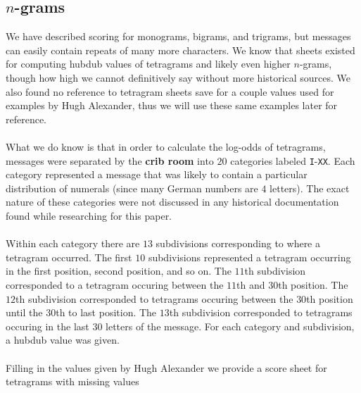 \subsection{$n$-grams}
We have described scoring for monograms, bigrams, and trigrams, but
messages can easily contain repeats of many more characters. We
know that sheets existed for computing hubdub values of tetragrams
and likely even higher $n$-grams, though how high we cannot
definitively say without more historical sources. We also found no
reference to tetragram sheets save for a couple values used for
examples by Hugh Alexander, thus we will use these same examples
later for reference.
\\\\What we do know is that in order to calculate the log-odds of
tetragrams, messages were separated by the {\bf{crib room}} into
$20$ categories labeled \texttt{I}-\texttt{XX}. Each category
represented a message that was likely to contain a particular
distribution of numerals (since many German numbers are $4$
letters). The exact nature of these categories were not discussed
in any historical documentation found while researching for this paper.
\\\\Within each category there are $13$ subdivisions corresponding
to where a tetragram occurred. The first $10$ subdivisions
represented a tetragram occurring in the first position, second
position, and so on. The $11$th subdivision corresponded to a
tetragram occuring between the $11$th and $30$th position. The
$12$th subdivision corresponded to tetragrams occuring between the
$30$th position until the $30$th to last position. The $13$th
subdivision corresponded to tetragrams occuring in the last $30$
letters of the message. For each category and subdivision, a hubdub
value was given.
\\\\Filling in the values given by Hugh Alexander we provide a
score sheet for tetragrams with missing values
